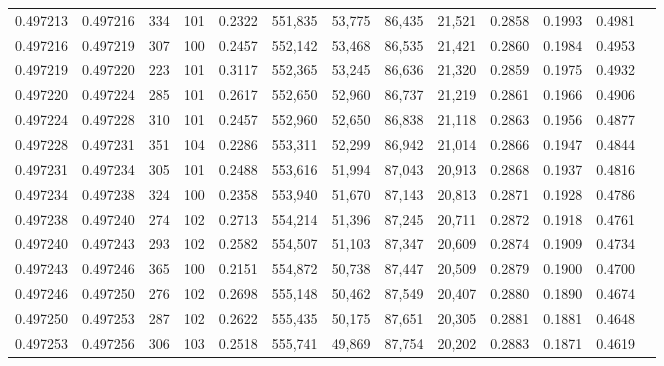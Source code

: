 \begin{tabular}{rrrrrrrrrrrrr}
0.497213 & 0.497216 &   334 & 101 &                                     0.2322 & 551,835 &  53,775 &  86,435 &  21,521 & 0.2858 & 0.1993 & 0.4981 \\
0.497216 & 0.497219 &   307 & 100 &                                     0.2457 & 552,142 &  53,468 &  86,535 &  21,421 & 0.2860 & 0.1984 & 0.4953 \\
0.497219 & 0.497220 &   223 & 101 &                                     0.3117 & 552,365 &  53,245 &  86,636 &  21,320 & 0.2859 & 0.1975 & 0.4932 \\
0.497220 & 0.497224 &   285 & 101 &                                     0.2617 & 552,650 &  52,960 &  86,737 &  21,219 & 0.2861 & 0.1966 & 0.4906 \\
0.497224 & 0.497228 &   310 & 101 &                                     0.2457 & 552,960 &  52,650 &  86,838 &  21,118 & 0.2863 & 0.1956 & 0.4877 \\
0.497228 & 0.497231 &   351 & 104 &                                     0.2286 & 553,311 &  52,299 &  86,942 &  21,014 & 0.2866 & 0.1947 & 0.4844 \\
0.497231 & 0.497234 &   305 & 101 &                                     0.2488 & 553,616 &  51,994 &  87,043 &  20,913 & 0.2868 & 0.1937 & 0.4816 \\
0.497234 & 0.497238 &   324 & 100 &                                     0.2358 & 553,940 &  51,670 &  87,143 &  20,813 & 0.2871 & 0.1928 & 0.4786 \\
0.497238 & 0.497240 &   274 & 102 &                                     0.2713 & 554,214 &  51,396 &  87,245 &  20,711 & 0.2872 & 0.1918 & 0.4761 \\
0.497240 & 0.497243 &   293 & 102 &                                     0.2582 & 554,507 &  51,103 &  87,347 &  20,609 & 0.2874 & 0.1909 & 0.4734 \\
0.497243 & 0.497246 &   365 & 100 &                                     0.2151 & 554,872 &  50,738 &  87,447 &  20,509 & 0.2879 & 0.1900 & 0.4700 \\
0.497246 & 0.497250 &   276 & 102 &                                     0.2698 & 555,148 &  50,462 &  87,549 &  20,407 & 0.2880 & 0.1890 & 0.4674 \\
0.497250 & 0.497253 &   287 & 102 &                                     0.2622 & 555,435 &  50,175 &  87,651 &  20,305 & 0.2881 & 0.1881 & 0.4648 \\
0.497253 & 0.497256 &   306 & 103 &                                     0.2518 & 555,741 &  49,869 &  87,754 &  20,202 & 0.2883 & 0.1871 & 0.4619 \\

\end{tabular}
